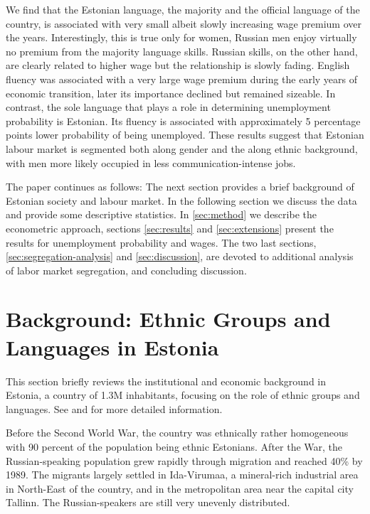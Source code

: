 \documentclass[12pt, a4paper]{article}
\begin{document}
We find that the Estonian language, the majority and the official
language of the country, is associated with very
small albeit slowly increasing wage premium over
the years.  Interestingly, this is true only for women, Russian men enjoy
virtually no premium from the majority language skills.
Russian skills, on the other hand, are clearly related to
higher wage but the relationship is slowly fading.  English fluency was
associated with a very large wage premium during the early years of
economic transition, later its importance
declined but remained sizeable.  
In contrast, the sole language that plays a role in determining
unemployment probability is Estonian.  Its fluency is associated with
approximately 5 percentage points lower probability of being unemployed.
These results suggest that Estonian labour market is      
segmented both along gender and the along ethnic background, with men
more likely occupied in less communication-intense jobs.


The paper continues as follows: The next section provides a brief
background of Estonian society and labour market. In the following
section we discuss the data and provide some descriptive
statistics. In \cref{sec:method} we describe the econometric
approach, sections \ref{sec:results} and \ref{sec:extensions} present
the results for unemployment probability and wages.  The two last
sections, \ref{sec:segregation-analysis} and \ref{sec:discussion}, are
devoted to additional analysis of labor market segregation, and
concluding discussion.


\section{Background: Ethnic Groups and Languages in Estonia}
\label{sec:hist_background}

This section briefly reviews the institutional and economic background
in Estonia, a country of 1.3M inhabitants,
focusing on the role of ethnic groups and languages.
See \citet{Leping2008} and
\citet{lindemann+saar2011Russian2ndGeneration} for more detailed information.

Before the Second World War, the country was ethnically rather
homogeneous with 90 percent of the population being ethnic Estonians. After the War,
the Russian-speaking population grew rapidly through migration and
reached 40\% by 1989.  The migrants largely settled in Ida-Virumaa, a
mineral-rich industrial area in North-East of the country, and in the
metropolitan area near the capital city Tallinn.  The
Russian-speakers are still very unevenly distributed.
\end{document}
